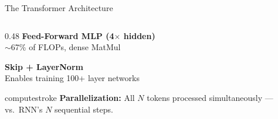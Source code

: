 \documentclass[aspectratio=169, 12pt]{beamer}
\begin{document}
\begin{frame}{The Transformer Architecture}
\begin{columns}[T]
\begin{column}{0.48\textwidth}
    \vspace{0.1cm}
    \textcolor{routingstroke}{\textbf{Feed-Forward MLP (4$\times$ hidden)}}\\
    {\footnotesize $\sim$67\% of FLOPs, dense MatMul}

    \vspace{0.1cm}
    \textcolor{datastroke}{\textbf{Skip + LayerNorm}}\\
    {\footnotesize Enables training 100+ layer networks}

    \vspace{0.15cm}
    \begin{mlsyscard}{computestroke}
    {\footnotesize \textbf{Parallelization:} All $N$ tokens processed simultaneously --- vs.\ RNN's $N$ sequential steps.}
    \end{mlsyscard}
  \end{column}
\end{columns}

\end{frame}
\end{document}
